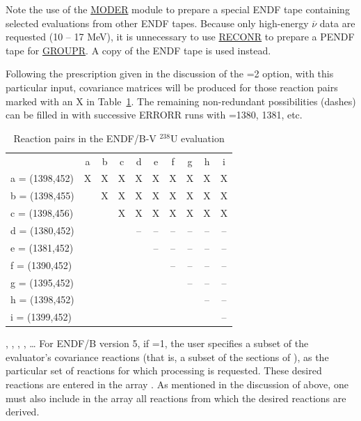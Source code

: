 Note the use of the \hyperlink{sMODERhy}{MODER} module
to prepare a special ENDF tape
containing selected evaluations from other ENDF tapes.  Because only
high-energy $\overline{\nu}$ data are requested (10 -- 17 MeV), it is
unnecessary to use \hyperlink{sRECONRhy}{RECONR} to prepare
a PENDF tape for \hyperlink{sGROUPRhy}{GROUPR}.  A copy
of the ENDF tape is used instead.

Following the prescription given in the discussion of the
=2 option, with this particular input, covariance matrices
will be produced for those reaction pairs marked with an X in
Table~\ref{pairs}.  The remaining non-redundant possibilities (dashes)
can be filled in with successive ERRORR runs with
=1380, 1381, etc.

\begin{table}[t]
\caption{Reaction pairs in the ENDF/B-V $^{238}$U evaluation}
\label{pairs}
\begin{center}
\begin{tabular}{|l|c|c|c|c|c|c|c|c|c|}
\hline
    & a  &  b  &  c  &  d  &  e  &  f  &  g  &  h  & i \\ \cline{1-10}
a = (1398,452) &  X  &  X  &  X  &  X  &  X  &  X  &  X  &  X  &  X \\
b = (1398,455) &  &  X  &  X &  X  &  X  &  X  &  X  &  X  &  X \\
c = (1398,456) &  &  &  X &  X  &  X  &  X  &  X  &  X  &  X  \\
d = (1380,452) &  &  &  &  -- &  -- &  --  &  -- &  -- &  -- \\
e = (1381,452) &  &  &  &     &  -- &--  &  -- &  -- &  -- \\
f = (1390,452) &  &  &  &     &     &  --  &  -- &  -- &  -- \\
g = (1395,452) &  &  &  &     &     &      &  -- &  -- &  --  \\
h = (1398,452) &  &  &  &     &     &      &     &  -- &  --  \\
i = (1399,452) &  &  &  &     &     &      &     &     &  -- \\
\cline{1-10}
\end{tabular}
\end{center}
\end{table}

, , , , 
\ldots\hspace{.1in}
For ENDF/B version 5, if =1, the user specifies a subset of the
evaluator's covariance reactions (that is, a subset of the sections
of ), as the particular set of reactions for which
processing is requested.  These  desired reactions are
entered in the array .  As mentioned in the discussion of
 above, one must also include in the  array all
reactions from which the desired reactions are derived.

